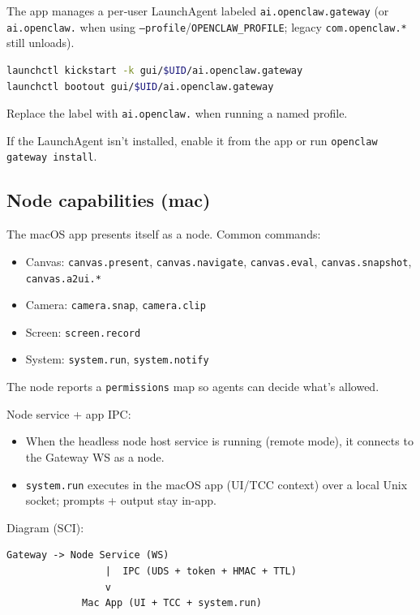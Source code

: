 The app manages a per‑user LaunchAgent labeled \texttt{ai.openclaw.gateway}
(or \texttt{ai.openclaw.} when using \texttt{--profile}/\texttt{OPENCLAW\_PROFILE}; legacy \texttt{com.openclaw.*} still unloads).

\begin{lstlisting}[language=bash]
launchctl kickstart -k gui/$UID/ai.openclaw.gateway
launchctl bootout gui/$UID/ai.openclaw.gateway
\end{lstlisting}


Replace the label with \texttt{ai.openclaw.} when running a named profile.

If the LaunchAgent isn’t installed, enable it from the app or run
\texttt{openclaw gateway install}.

\subsection{Node capabilities (mac)}


The macOS app presents itself as a node. Common commands:

\begin{itemize}
  \item Canvas: \texttt{canvas.present}, \texttt{canvas.navigate}, \texttt{canvas.eval}, \texttt{canvas.snapshot}, \texttt{canvas.a2ui.*}
  \item Camera: \texttt{camera.snap}, \texttt{camera.clip}
  \item Screen: \texttt{screen.record}
  \item System: \texttt{system.run}, \texttt{system.notify}
\end{itemize}


The node reports a \texttt{permissions} map so agents can decide what’s allowed.

Node service + app IPC:

\begin{itemize}
  \item When the headless node host service is running (remote mode), it connects to the Gateway WS as a node.
  \item \texttt{system.run} executes in the macOS app (UI/TCC context) over a local Unix socket; prompts + output stay in-app.
\end{itemize}


Diagram (SCI):

\begin{lstlisting}
Gateway -> Node Service (WS)
                 |  IPC (UDS + token + HMAC + TTL)
                 v
             Mac App (UI + TCC + system.run)
\end{lstlisting}


